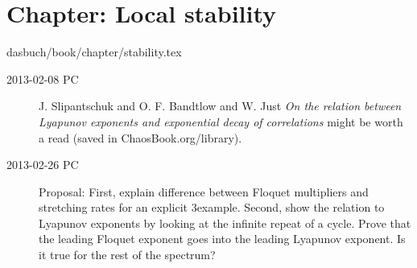 \section{Chapter: Local stability}
\label{c-stability}\noindent dasbuch/book/chapter/stability.tex
\begin{description}

\item[2013-02-08 PC]
J. Slipantschuk and O. F. Bandtlow and W. Just
{\em On the relation between Lyapunov exponents and exponential decay
of correlations} might be worth a read (saved in
ChaosBook.org/library).

\item[2013-02-26 PC]                \inCB
Proposal: First, explain difference between Floquet multipliers and
stretching rates for an explicit 3\dmn example. Second, show the
relation to Lyapunov exponents by looking at the infinite repeat of a
cycle. Prove that the leading Floquet exponent goes into the leading
Lyapunov exponent. Is it true for the rest of the spectrum?


\end{description}


